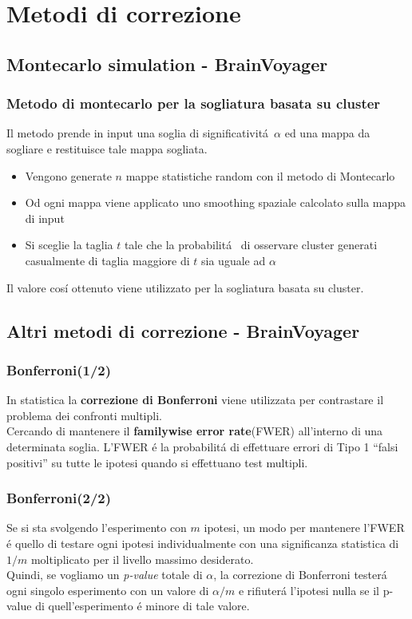 \documentclass{beamer}
\begin{document}
\section{Metodi di correzione}
\subsection{Montecarlo simulation - BrainVoyager}
\begin{frame}
\frametitle{Metodo di montecarlo per la sogliatura basata su cluster}
Il metodo prende in input una soglia di significativit\'a $\alpha$ ed una mappa da sogliare e restituisce tale mappa sogliata.
\begin{itemize}
\item Vengono generate $n$ mappe statistiche random con il metodo di Montecarlo
\item Od ogni mappa viene applicato uno smoothing spaziale calcolato sulla mappa di input
\item Si sceglie la taglia $t$ tale che la probabilit\'a  di osservare cluster generati casualmente di taglia maggiore di $t$ sia uguale ad $\alpha$
\end{itemize}
Il valore cos\'i ottenuto viene utilizzato per la sogliatura basata su cluster. 
\end{frame}

\subsection{Altri metodi di correzione - BrainVoyager}
\begin{frame}
\frametitle{Bonferroni(1/2)}
In statistica la \textbf{correzione di Bonferroni} viene utilizzata per contrastare il problema dei confronti multipli.\\
\medskip
Cercando di mantenere il \textbf{familywise error rate}(FWER) all'interno di una determinata soglia.
\medskip
L'FWER \'e la probabilit\'a di effettuare errori di Tipo 1 ``falsi positivi'' su tutte le ipotesi quando si effettuano test multipli.
\end{frame}

\begin{frame}
\frametitle{Bonferroni(2/2)}
Se si sta svolgendo l'esperimento con $m$ ipotesi, un modo per mantenere l'FWER \'e quello di testare ogni ipotesi individualmente con una significanza statistica di $1/m$ moltiplicato per il livello massimo desiderato.
\\ \medskip
Quindi, se vogliamo un \emph{p-value} totale di $\alpha$, la correzione di Bonferroni tester\'a ogni singolo esperimento con un valore di $\alpha/m$ e rifiuter\'a l'ipotesi nulla se il p-value di quell'esperimento \'e minore di tale valore.
\end{frame}
\end{document}
